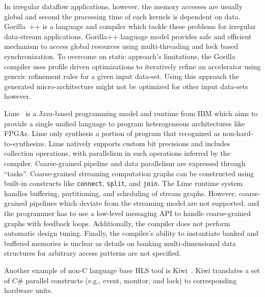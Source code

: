In irregular dataflow applications, however, the memory accesses are usually global and second the processing time of each kernels is dependent on data. 
Gorilla~\cite{lavasani_thesis}++ is a language and compiler which tackle these problems for irregular  data-stream applications.
Gorilla++ language model provides safe and efficient mechanism to access global resources using multi-threading and lock based synchronization.
To overcome on static approach's limitations, the Gorilla compiler uses profile driven optimizations to iteratively refine an accelerator using generic refinement rules for a given input data-set.
Using this approach the generated micro-architecture might not be optimized for other input data-sets however.

Lime~\cite{lime} is a Java-based programming model and runtime from IBM which aims to provide a single unified language to program heterogeneous architectures like FPGAs.
Lime only synthesis a portion of program that recognized as non-hard-to-synthesize.
Lime natively supports custom bit precisions and includes collection operations, with parallelism in such operations inferred by the compiler.
Coarse-grained pipeline and data parallelism are expressed through ``tasks''.
Coarse-grained streaming computation graphs can be constructed using built-in constructs like \texttt{\small{connect}}, \texttt{\small{split}}, and \texttt{\small{join}}.
The Lime runtime system handles buffering, partitioning, and scheduling of stream graphs.
However, coarse-grained pipelines which deviate from the streaming model are not supported, and the programmer has to use a low-level messaging API to handle coarse-grained graphs with feedback loops.
Additionally, the compiler does not perform automatic design tuning.
Finally, the compiler's ability to instantiate banked and buffered memories is unclear as details on banking multi-dimensional data structures for arbitrary access patterns are not specified.

Another example of non-C language base HLS tool is Kiwi~\cite{kiwi}.
Kiwi translates a set of $C\#$ parallel constructs (e.g., event, monitor, and lock) to corresponding hardware units.